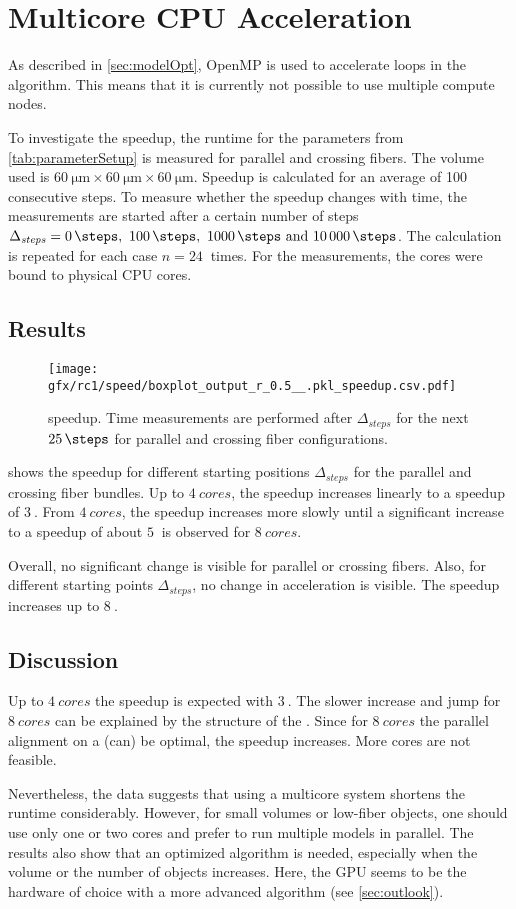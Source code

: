 \section{Multicore CPU Acceleration}
%
As described in \cref{sec:modelOpt}, \ac{OpenMP} is used to accelerate  loops in the algorithm.
This means that it is currently not possible to use multiple compute nodes.
\par
% 
To investigate the speedup, the runtime for the parameters from \cref{tab:parameterSetup} is measured for parallel and crossing fibers.
The volume used is $\SI{60}{\micro\meter} \times \SI{60}{\micro\meter} \times \SI{60}{\micro\meter}$.
Speedup is calculated for an average of 100 consecutive steps.
To measure whether the speedup changes with time, the measurements are started after a certain number of steps $\Delta_{\mathit{steps}} = \SIlist{0;100;1000;10000}{\steps}$.
The calculation is repeated for each case $n=\SI{24}{}$ times.
For the measurements, the cores were bound to physical CPU cores.
%
% 
% 
\subsection{Results}
% 
\begin{figure}[!t]
\centering
\texttt{[image: gfx/rc1/speed/boxplot\_output\_r\_0.5\_\_.pkl\_speedup.csv.pdf]}
\caption{ speedup. Time measurements are performed after $\Delta_{\mathit{steps}}$ for the next $\SI{25}{\steps}$ for parallel \pfbs{} and crossing \cfbs{} fiber configurations.}
\label{fig:solverSpeedup}
\end{figure}
% 
 shows the speedup for different starting positions $\Delta_{\mathit{steps}}$ for the parallel \pfbs{} and crossing \cfbs{} fiber bundles.
Up to $\SI{4}{cores}$, the speedup increases linearly to a speedup of $\SI{3}{}$.
From $\SI{4}{cores}$, the speedup increases more slowly until a significant increase to a speedup of about $\SI{5}{}$ is observed for $\SI{8}{cores}$.
\par
% 
Overall, no significant change is visible for parallel or crossing fibers.
Also, for different starting points $\Delta_{\mathit{steps}}$, no change in acceleration is visible.
The speedup increases up to $\SI{8}{}$.
% 
% 
% 
\subsection{Discussion}
% 
Up to $\SI{4}{cores}$ the speedup is expected with $\SI{3}{}$.
The slower increase and jump for $\SI{8}{cores}$ can be explained by the structure of the .
Since for $\SI{8}{cores}$ the parallel alignment on a  (can) be optimal, the speedup increases.
More cores are not feasible.
\par
% 
Nevertheless, the data suggests that using a multicore system shortens the runtime considerably.
However, for small volumes or low-fiber objects, one should use only one or two cores and prefer to run multiple models in parallel.
The results also show that an optimized algorithm is needed, especially when the volume or the number of objects increases.
Here, the \ac{GPU} seems to be the hardware of choice with a more advanced algorithm \cite{Karras2012} (see \cref{sec:outlook}).